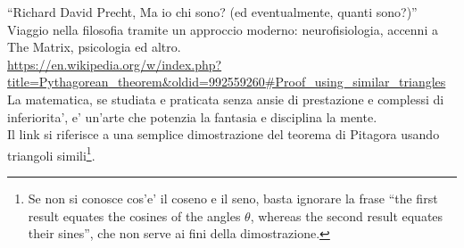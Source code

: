   ``Richard David Precht, Ma io chi sono? (ed eventualmente, quanti sono?)''\\
  Viaggio nella filosofia tramite un approccio moderno: neurofisiologia, accenni a The Matrix, psicologia ed altro.\\
   
    \url{https://en.wikipedia.org/w/index.php?title=Pythagorean\_theorem&oldid=992559260\#Proof\_using\_similar\_triangles}\\
  La matematica, se studiata e praticata senza ansie di prestazione e complessi di inferiorita',
  e' un'arte che potenzia la fantasia e disciplina la mente.\\
  Il link si riferisce a una semplice dimostrazione del teorema di Pitagora usando triangoli simili\footnote{Se non si conosce cos'e' il coseno e il seno, basta ignorare la frase ``the first result equates the cosines of the angles $\theta$, whereas the second result equates their sines'', che non serve ai fini della dimostrazione.}.\\


